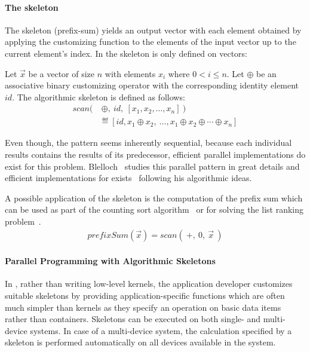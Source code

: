 \paragraph{The \scan skeleton}
The \scan skeleton (\aka prefix-sum) yields an output vector with each element obtained by applying the customizing function to the elements of the input vector up to the current element's index.
In \SkelCL the \scan skeleton is only defined on vectors:
\begin{definition}
  \label{definition:scan}
  Let $\vec{x}$ be a vector of size $n$ with elements $x_i$ where $0 < i \leq n$.
  Let $\oplus$ be an associative binary customizing operator with the corresponding identity element $id$.
  The algorithmic skeleton \scan is defined as follows:
  \begin{equation*}
    \begin{split}
    scan \big(&\ \oplus,\ id,\ [x_1, x_2, \dots, x_n]\ \big) \\
      &\eqdef [id, x_1 \oplus x_2,\ \dots,x_1 \oplus x_2 \oplus \cdots \oplus x_n]
    \end{split}
  \end{equation*}
\end{definition}
\noindent
Even though, the \scan pattern seems inherently sequential, because each individual results contains the results of its predecessor, efficient parallel implementations do exist for this problem.
Blelloch~\cite{Blelloch1991} studies this parallel pattern in great details and efficient implementations for \GPUs exists~\cite{HarrisSeOw2007} following his algorithmic ideas.

A possible application of the \scan skeleton is the computation of the prefix sum which can be used as part of the counting sort algorithm~\cite{Knuth1998} or for solving the list ranking problem~\cite{ColeVi1989}.
\begin{align*}
  prefixSum(\vec{x}) = scan(\ +,\ 0,\ \vec{x}\ )
\end{align*}

\paragraph{Parallel Programming with Algorithmic Skeletons}
In \SkelCL, rather than writing low-level kernels, the application developer customizes suitable skeletons by providing application-specific functions which are often much simpler than kernels as they specify an operation on basic data items rather than containers.
Skeletons can be executed on both single- and multi-device systems.
In case of a multi-device system, the calculation specified by a skeleton is performed automatically on all devices available in the system.

